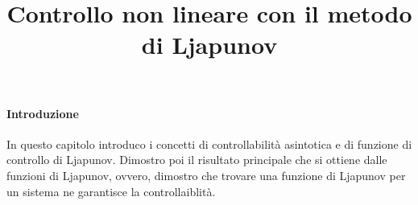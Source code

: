 \title{Controllo non lineare con il metodo di Ljapunov}

\maketitle
\label{sec:nonlinear-control}


\paragraph{Introduzione}

In questo capitolo introduco i concetti di
controllabilità asintotica e di funzione di controllo di
Ljapunov. Dimostro poi il risultato principale
che si ottiene dalle funzioni di Ljapunov, ovvero,
dimostro che trovare una funzione di Ljapunov per un sistema
ne garantisce la controllaiblità.



